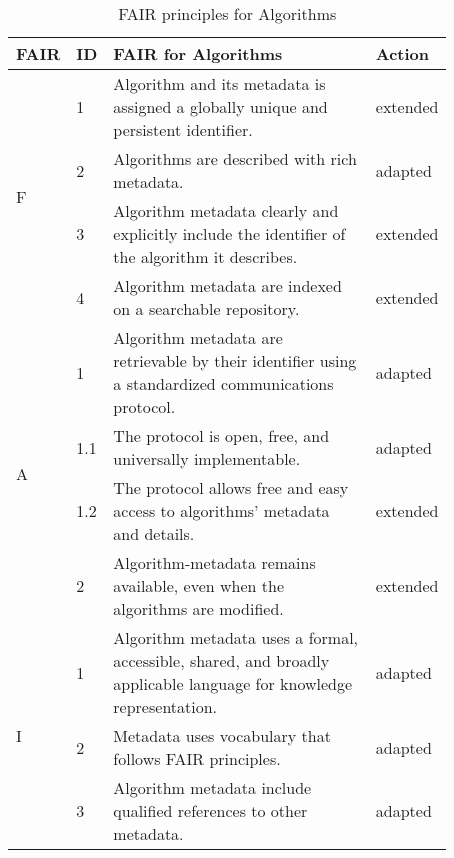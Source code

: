 \documentclass[preprint,12pt]{elsarticle}
\begin{document}

\begin{table*}[!t]
\caption{FAIR principles for Algorithms\label{tab:FAIR for Algo}}
\renewcommand{\arraystretch}{1.1}
\centering \scriptsize
\begin{tabular}{|p{0.05\linewidth}|p{0.05\linewidth}|p{0.67\linewidth}|p{0.1\linewidth}|}
\hline
FAIR & ID & FAIR for Algorithms & Action\\
\hline
\multirow{4}{*}{F} & 1 & Algorithm and its metadata is assigned a globally unique and persistent identifier. & extended \\
\cline{2-4}
 & 2 & Algorithms are described with rich metadata. & adapted \\
\cline{2-4} 
 & 3 & Algorithm metadata clearly and explicitly include the identifier of the algorithm it describes. 
    & extended \\
\cline{2-4}
 & 4 & Algorithm metadata are indexed on a searchable repository. & extended \\
\hline

\multirow{4}{*}{A} & 1 &  Algorithm metadata are retrievable by their identifier using a standardized communications protocol. & adapted\\
\cline{2-4}
 & 1.1 &  The protocol is open, free, and universally implementable. & adapted\\
\cline{2-4}
 & 1.2 &  The protocol allows free and easy access to algorithms' metadata and details.& extended \\
\cline{2-4}
 & 2 & Algorithm-metadata remains available, even when the algorithms are modified. & extended \\
\hline

\multirow{3}{*}{I} & 1 & Algorithm metadata uses a formal, accessible, shared, and broadly applicable language for knowledge representation.& adapted  \\
\cline{2-4}
 & 2 & Metadata uses vocabulary that follows FAIR principles. & adapted  \\
 \cline{2-4}
 & 3 & Algorithm metadata include qualified references to other metadata. & adapted \\
\hline


\end{tabular}
\end{table*}
\end{document}
